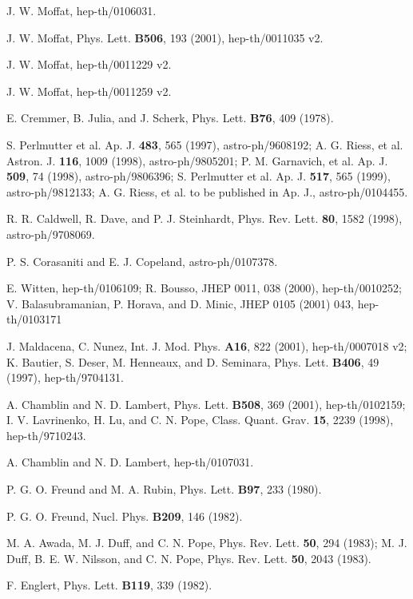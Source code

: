 \documentclass[a4paper,12pt]{article}
\begin{document}
\begin{thebibliography}{100}
 
 J. W. Moffat, hep-th/0106031.

 J. W. Moffat, Phys. Lett. {\bf B506}, 193
(2001), hep-th/0011035 v2.

 J. W. Moffat, hep-th/0011229 v2.

 J. W. Moffat, hep-th/0011259 v2.

 E. Cremmer, B. Julia, and J. Scherk, Phys. Lett. {\bf
B76}, 409 (1978).

 S. Perlmutter et al. Ap. J. {\bf 483},
565 (1997), astro-ph/9608192; A. G. Riess, et al. Astron. J. {\bf 116},
1009 (1998), astro-ph/9805201; P. M. Garnavich, et al. Ap. J. {\bf 509}, 74
(1998), astro-ph/9806396; S. Perlmutter et al. Ap. J. {\bf 517}, 565
(1999), astro-ph/9812133; A. G. Riess, et al. to be published in Ap. J.,
astro-ph/0104455.

 R. R. Caldwell, R. Dave, and P. J. Steinhardt, Phys.
Rev. Lett. {\bf 80}, 1582 (1998), astro-ph/9708069.

 P. S. Corasaniti and E. J. Copeland, astro-ph/0107378.

 E. Witten, hep-th/0106109; R. Bousso, JHEP 0011, 038
(2000), hep-th/0010252; V. Balasubramanian, P. Horava, and D. Minic, JHEP
0105 (2001) 043, hep-th/0103171

 J. Maldacena, C. Nunez, Int. J. Mod. Phys. {\bf A16},
822 (2001), hep-th/0007018 v2; K. Bautier, S. Deser, M. Henneaux, and D.
Seminara, Phys. Lett. {\bf B406}, 49 (1997), hep-th/9704131.

 A. Chamblin and N. D. Lambert,
Phys. Lett. {\bf B508}, 369 (2001), hep-th/0102159; I. V. Lavrinenko, H. Lu,
and C. N. Pope, Class. Quant. Grav. {\bf 15}, 2239 (1998), hep-th/9710243.

 A. Chamblin and N. D. Lambert, hep-th/0107031.

 P. G. O. Freund and M. A. Rubin, Phys. Lett. {\bf B97},
233 (1980).

 P. G. O. Freund, Nucl. Phys. {\bf B209}, 146 (1982).

 M. A. Awada, M. J. Duff, and C. N. Pope, Phys.
Rev. Lett. {\bf 50}, 294 (1983); M. J. Duff, B. E. W. Nilsson, and C. N.
Pope, Phys. Rev. Lett. {\bf 50}, 2043 (1983).

 F. Englert, Phys. Lett. {\bf B119}, 339 (1982).

\end{thebibliography}
\end{document}
